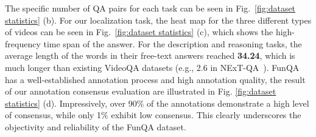 The specific number of QA pairs for each task can be seen in Fig.~\ref{fig:dataset statistics} (b). For our localization task, the heat map for the three different types of videos can be seen in Fig.~\ref{fig:dataset statistics} (c), which shows the high-frequency time span of the answer. 
For the description and reasoning tasks, the average length of the words in their free-text answers reached \textbf{34.24}, which is much longer than existing VideoQA datasets (e.g., 2.6 in NExT-QA~\cite{xiao2021nextqanext}).
FunQA has a well-established annotation process and high annotation quality, the result of our annotation consensus evaluation are illustrated in Fig. \ref{fig:dataset statistics} (d).  Impressively, over 90\% of the annotations demonstrate a high level of consensus, while only 1\% exhibit low consensus. This clearly underscores the objectivity and reliability of the FunQA dataset.
